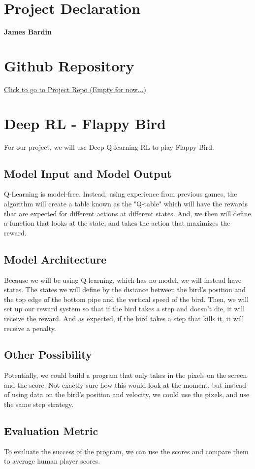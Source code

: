 \documentclass[11pt]{article}
\begin{document}
        \section*{Project Declaration}

        \textbf{James Bardin}

\section*{Github Repository}

\href{https://github.com/jamesbardin/Neuro_140_Project}{Click to go to Project Repo (Empty for now...)}

\section*{Deep RL - Flappy Bird}

For our project, we will use Deep Q-learning RL to play Flappy Bird. 

\subsection*{Model Input and Model Output}

Q-Learning is model-free. Instead, using experience from previous games, the algorithm will create a table known as the "Q-table" which will have the rewards that are expected for different actions at different states. And, we then will define a function that looks at the state, and takes the action that maximizes the reward. 

\subsection*{Model Architecture}

Because we will be using Q-learning, which has no model, we will instead have states. The states we will define by the distance between the bird's position and the top edge of the bottom pipe and the vertical speed of the bird. Then, we will set up our reward system so that if the bird takes a step and doesn't die, it will receive the reward. And as expected, if the bird takes a step that kills it, it will receive a penalty. 

\subsection*{Other Possibility}

Potentially, we could build a program that only takes in the pixels on the screen and the score. Not exactly sure how this would look at the moment, but instead of using data on the bird's position and velocity, we could use the pixels, and use the same step strategy.

\subsection*{Evaluation Metric}

To evaluate the success of the program, we can use the scores and compare them to average human player scores. 
\end{document}
